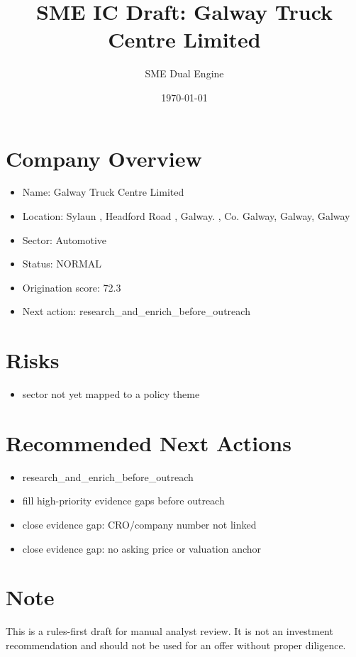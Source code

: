 \documentclass[11pt,a4paper]{article}
\title{SME IC Draft: Galway Truck Centre Limited}
\author{SME Dual Engine}
\date{\today}
\begin{document}
\maketitle
\section*{Company Overview}
\begin{itemize}[leftmargin=1.4em]
\item Name: Galway Truck Centre Limited
\item Location: Sylaun , Headford Road , Galway. , Co. Galway, Galway, Galway
\item Sector: Automotive
\item Status: NORMAL
\item Origination score: 72.3
\item Next action: research\_and\_enrich\_before\_outreach
\end{itemize}
\section*{Risks}
\begin{itemize}[leftmargin=1.4em]
\item sector not yet mapped to a policy theme
\end{itemize}
\section*{Recommended Next Actions}
\begin{itemize}[leftmargin=1.4em]
\item research\_and\_enrich\_before\_outreach
\item fill high-priority evidence gaps before outreach
\item close evidence gap: CRO/company number not linked
\item close evidence gap: no asking price or valuation anchor
\end{itemize}
\section*{Note}
This is a rules-first draft for manual analyst review. It is not an investment
recommendation and should not be used for an offer without proper diligence.
\end{document}
